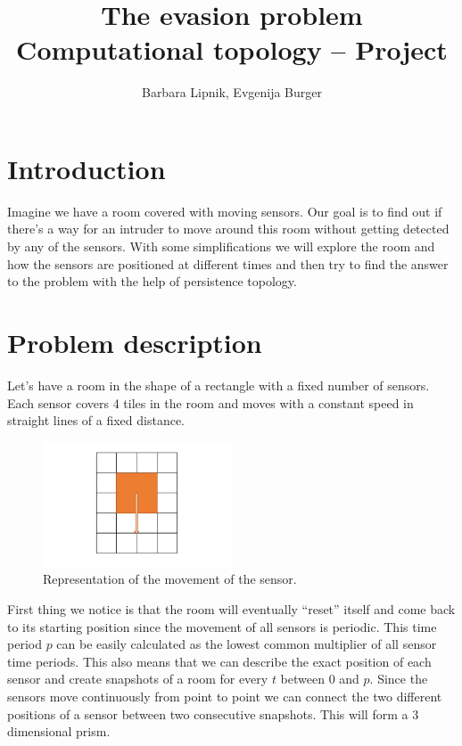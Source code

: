 \documentclass{article}
\title{%
The evasion problem \\
\large Computational topology -- Project}
\author{Barbara Lipnik, Evgenija Burger}
\begin{document}
\maketitle


\section{Introduction}
Imagine we have a room covered with moving sensors. Our goal is to find out if there's a way for an intruder to move around this room without getting detected by any of the sensors. With some simplifications we will explore the room and how the sensors are positioned at different times and then try to find the answer to the problem with the help of persistence topology. 


\section{Problem description}
Let's have a room in the shape of a rectangle with a fixed number of sensors. Each sensor covers 4 tiles in the room and moves with a constant speed in straight lines of a fixed distance.

\begin{figure}[!h]
    \centering
    \includegraphics[width=0.5\textwidth]{sensors}
    \caption{Representation of the movement of the sensor.}
    \label{fig:sensors}
\end{figure}

 First thing we notice is that the room will eventually ``reset'' itself and come back to its starting position since the movement of all sensors is periodic. This time period $p$ can be easily calculated as the lowest common multiplier of all sensor time periods. This also means that we can describe the exact position of each sensor  and create snapshots of a room for every $t$ between 0 and $p$. Since the sensors move continuously from point to point we can connect the two different positions of a sensor between two consecutive snapshots. This will form a 3 dimensional prism. 
 
\end{document}

